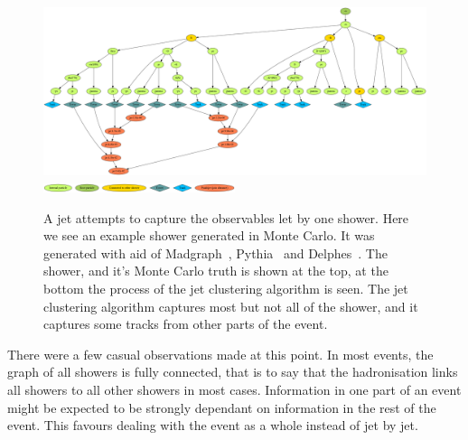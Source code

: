 \begin{figure}
    \centering
    \includegraphics[width=1.\textwidth]{images/prog_bjetShower.png}
    \includegraphics[width=0.5\textwidth]{images/prog_legend.png}
    \caption{A jet attempts to capture the observables let by one shower. Here we see an example shower generated in Monte Carlo.
        It was generated with aid of Madgraph~\cite{alwall_madgraph2011}, Pythia~\cite{sjostrand_pythia2015} and Delphes~\cite{deFavereau_delphesA2014}.
             The shower, and it's Monte Carlo truth is shown at the top, at the bottom
             the process of the jet clustering algorithm is seen.
         The jet clustering algorithm captures most but not all of the shower, and it captures some tracks from other parts of the event.}
    \label{fig:prog_bjetShower}
\end{figure}


There were a few casual observations made at this point. 
In most events, the graph of all showers is fully connected,
that is to say that the hadronisation links all showers to all other showers in most cases.
Information in one part of an event might be expected to be strongly dependant on information in the rest of the event.
This favours dealing with the event as a whole instead of jet by jet.

